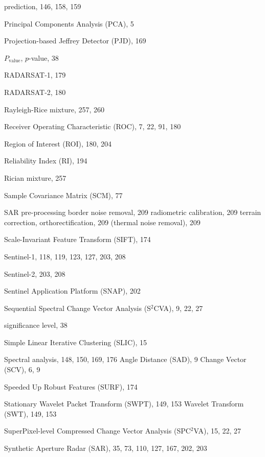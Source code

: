 \documentclass[fleqn,treatise,allpages]{ISTE_Science}
\begin{document}
\begin{theindex}
  \item prediction, 146, 158, 159
  \item Principal Components Analysis (PCA), 5
  \item Projection-based Jeffrey Detector (PJD), 169
\item $P_{\textrm{value}}$, $p$-value, 38
  \item RADARSAT-1, 179
  \item RADARSAT-2, 180
  \item Rayleigh-Rice mixture, 257, 260
  \item Receiver Operating Characteristic (ROC), 7, 22, 91, 180
  \item Region of Interest (ROI), 180, 204
  \item Reliability Index (RI), 194
  \item Rician mixture, 257
  \item Sample Covariance Matrix (SCM), 77
  \item SAR pre-processing
  \subitem border noise removal, 209
  \subitem radiometric calibration, 209
  \subitem terrain correction, orthorectification,
		209
  \subitem (thermal noise removal), 209
  \item Scale-Invariant Feature Transform (SIFT), 174
      \item Sentinel-1, 118, 119, 123, 127, 203, 208
  \item Sentinel-2, 203, 208
  \item Sentinel Application Platform (SNAP), 202
  \item Sequential Spectral Change Vector Analysis (S$^{2}$CVA), 9, 22,
		27
  \item significance level, 38
  \item Simple Linear Iterative Clustering (SLIC), 15
  \item Spectral
  \subitem analysis, 148, 150, 169, 176
  \subitem Angle Distance (SAD), 9
  \subitem Change Vector (SCV), 6, 9
  \item Speeded Up Robust Features (SURF), 174
  \item Stationary
  \subitem Wavelet Packet Transform (SWPT), 149, 153
  \subitem Wavelet Transform (SWT), 149, 153
  \item SuperPixel-level Compressed Change Vector Analysis (SPC$^{2}$VA),
		15, 22, 27
  \item Synthetic Aperture Radar (SAR), 35, 73, 110, 127, 167, 202, 203


\end{theindex}
\end{document}
